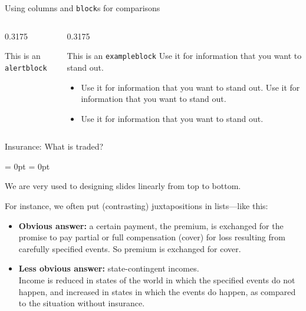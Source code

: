 \documentclass[aspectratio = 169, t, 10pt]{beamer}
\begin{document}
\begin{frame}{Using columns and \texttt{block}s for comparisons}
\begin{columns}[onlytextwidth, t]
\begin{column}{0.3175\textwidth}
\begin{alertblock}{This is an \texttt{alertblock\vphantom{p}}}
		\end{alertblock}
	\end{column}
	\begin{column}{0.3175\textwidth}
		\begin{exampleblock}{This is an \texttt{exampleblock}}
			Use it for information that you want to stand out.
			\begin{itemize}
				\itemsep = 0pt
				\item Use it for information that you want to stand out. Use it for information that you want to stand out.
				\item Use it for information that you want to stand out.
			\end{itemize}
		\end{exampleblock}
	\end{column}
\end{columns}

\end{frame}


\begin{frame}{Insurance: What is traded?}

\begin{list}{}{\leftmargin = 0pt \itemindent = 0pt}
	\item We are very used to designing slides linearly from top to bottom.
	\item For instance, we often put (contrasting) juxtapositions in lists---like this:
\end{list}
\begin{itemize}
	\item \textbf{Obvious answer:} a certain payment, the premium, is exchanged for the promise to pay partial or full compensation (cover) for loss resulting from carefully specified events. So premium is exchanged for cover.
	\item \textbf{Less obvious answer:} state-contingent incomes.\\
	Income is reduced in states of the world in which the specified events do not happen, and increased in states in which the events do happen, as compared to the situation without insurance.
\end{itemize}

\end{frame}
\end{document}

